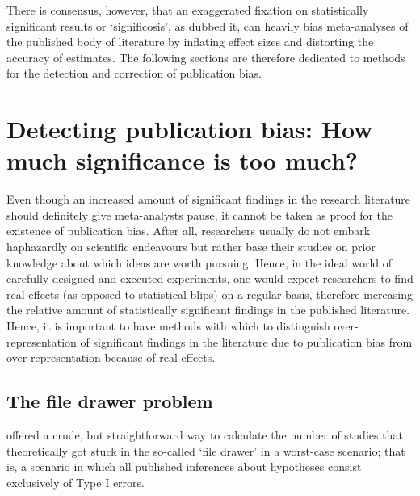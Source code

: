 There is consensus, however, that an exaggerated fixation on statistically significant results or `significosis', as \citet{antonakis_doing_2017} dubbed it, can heavily bias meta-analyses of the published body of literature by inflating effect sizes and distorting the accuracy of estimates. The following sections are therefore dedicated to methods for the detection and correction of publication bias.

\section{Detecting publication bias: How much significance is too much?}
\label{sec:detect_publication_bias}
Even though an increased amount of significant findings in the research literature should definitely give meta-analysts pause, it cannot be taken as proof for the existence of publication bias. After all, researchers usually do not embark haphazardly on scientific endeavours but rather base their studies on prior knowledge about which ideas are worth pursuing. Hence, in the ideal world of carefully designed and executed experiments, one would expect researchers to find real effects (as opposed to statistical blips) on a regular basis, therefore increasing the relative amount of statistically significant findings in the published literature. Hence, it is important to have methods with which to distinguish over-representation of significant findings in the literature due to publication bias from over-representation because of real effects.\par

\subsection{The file drawer problem}
\label{subsec:file drawer}
\citet{rosenthal_file_1979} offered a crude, but straightforward way to calculate the number of studies that theoretically got stuck in the so-called `file drawer' in a worst-case scenario; that is, a scenario in which all published inferences about hypotheses consist exclusively of Type I errors.\par

